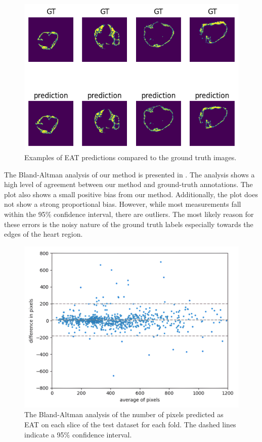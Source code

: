 \begin{figure}[b!]
    \centering
    \includegraphics[width=0.7\columnwidth]{images/6/examples.png}
    \caption{Examples of EAT predictions compared to the ground truth images. \cite{bencevicEpicardialAdiposeTissue2021}}
    \label{fig:examples}
\end{figure}

The Bland-Altman analysis of our method is presented in . The analysis shows a high level of agreement between our method and ground-truth annotations. The plot also shows a small positive bias from our method. Additionally, the plot does not show a strong proportional bias. However, while most measurements fall within the 95\% confidence interval, there are outliers. The most likely reason for these errors is the noisy nature of the ground truth labels especially towards the edges of the heart region.

\begin{figure}[t!]
    \centering
    \includegraphics[width=0.75\columnwidth]{images/6/blaltman.jpg}
    \caption{The Bland-Altman analysis of the number of pixels predicted as EAT on each slice of the test dataset for each fold. The dashed lines indicate a 95\% confidence interval. \cite{bencevicEpicardialAdiposeTissue2021}}
    \label{fig:corr}
\end{figure}

